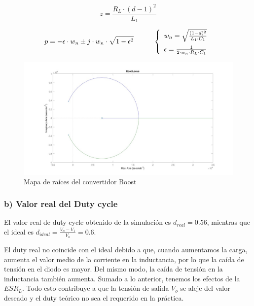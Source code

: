 \documentclass[e4_tp2_main.tex]{subfiles}
\begin{document}
\begin{equation}
z=\frac{R_L \cdot (d-1)^2}{L_1}
\end{equation}



\begin{equation}
p= - \epsilon \cdot w_n \pm j \cdot w_n \cdot \sqrt{1-{\epsilon}^2 } \hspace{1cm} \left\lbrace
\begin{array}{ll}
w_n=\sqrt{\frac{(1-d)^2}{L_1 \cdot C_1}} \vspace{0.2cm} \\
\epsilon= \frac{1}{2 \cdot w_n \cdot R_L \cdot C_1}
\end{array}
\right.
\end{equation}

  \begin{figure}[H]
  \centering
    \includegraphics[scale=0.4]{Imagenes/Punto1/rootlocus_Convertidor.jpeg}
    \caption{ Mapa de raíces del convertidor Boost}
  \end{figure}


\subsubsection*{b) Valor real del Duty cycle}

El valor real de duty cycle obtenido de la simulaci\'on es $d_{real}=0.56$, mientras que el ideal es $d_{ideal}= \frac{V_o-V_1}{V_o}=0.6$.


El duty real no coincide con el ideal debido a que, cuando aumentamos la carga, aumenta el valor medio de la corriente en la inductancia, por lo que la ca\'ida de tensi\'on en el diodo es mayor. Del mismo modo, la ca\'ida de tensi\'on en la inductancia tambi\'en aumenta. Sumado a lo anterior, tenemos los efectos de la $ESR_L$. Todo esto contribuye a que la tensi\'on de salida $V_o$ se aleje del valor deseado y el duty te\'orico no sea el requerido en la pr\'actica.
\end{document}

